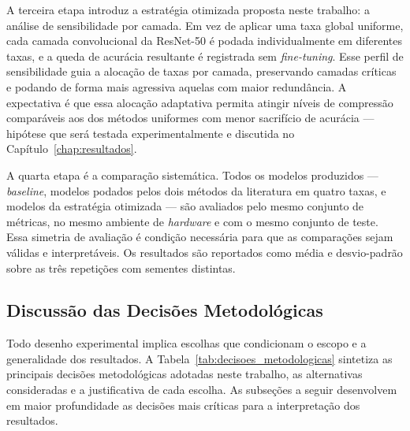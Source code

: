A terceira etapa introduz a estratégia otimizada proposta neste trabalho: a análise de sensibilidade por camada. Em vez de aplicar uma taxa global uniforme, cada camada convolucional da ResNet-50 é podada individualmente em diferentes taxas, e a queda de acurácia resultante é registrada sem \textit{fine-tuning}. Esse perfil de sensibilidade guia a alocação de taxas por camada, preservando camadas críticas e podando de forma mais agressiva aquelas com maior redundância. A expectativa é que essa alocação adaptativa permita atingir níveis de compressão comparáveis aos dos métodos uniformes com menor sacrifício de acurácia --- hipótese que será testada experimentalmente e discutida no Capítulo~\ref{chap:resultados}.

A quarta etapa é a comparação sistemática. Todos os modelos produzidos --- \textit{baseline}, modelos podados pelos dois métodos da literatura em quatro taxas, e modelos da estratégia otimizada --- são avaliados pelo mesmo conjunto de métricas, no mesmo ambiente de \textit{hardware} e com o mesmo conjunto de teste. Essa simetria de avaliação é condição necessária para que as comparações sejam válidas e interpretáveis. Os resultados são reportados como média e desvio-padrão sobre as três repetições com sementes distintas.

\subsection{Discussão das Decisões Metodológicas}\label{subsec:discussao_decisoes}

Todo desenho experimental implica escolhas que condicionam o escopo e a generalidade dos resultados. A Tabela~\ref{tab:decisoes_metodologicas} sintetiza as principais decisões metodológicas adotadas neste trabalho, as alternativas consideradas e a justificativa de cada escolha. As subseções a seguir desenvolvem em maior profundidade as decisões mais críticas para a interpretação dos resultados.

